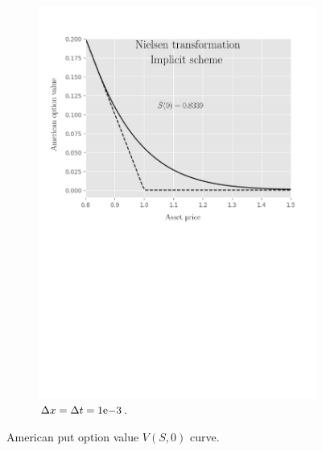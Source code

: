 \begin{figure}[H]
\begin{subfigure}{0.4\textwidth}
    \includegraphics[width=\textwidth]{chapters/chapter3/TestCase4ImplicitNielsen.pdf}
    \caption{$\Delta{x}=\Delta{t}={1}\mathrm{e}{-3}$.}
  \end{subfigure}
  \caption{American put option value $V(S, 0)$ curve.}
  \label{fig:finitedifferencesschemes:numericaresults:test_case_4}
\end{figure}

